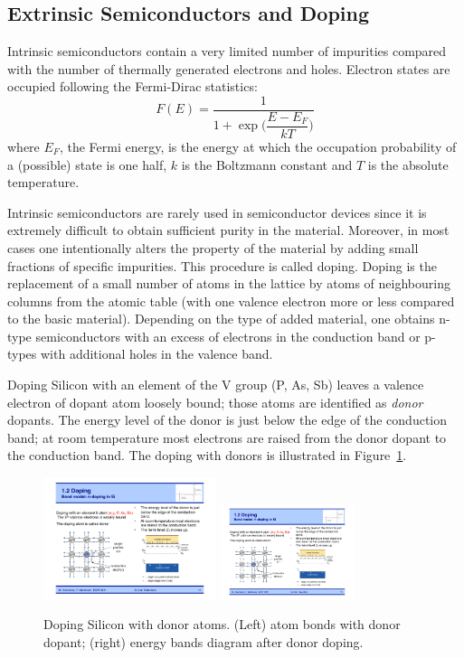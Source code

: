 \subsection{Extrinsic Semiconductors and Doping}

Intrinsic semiconductors contain a very limited number of impurities  compared with the number of 
thermally generated electrons and holes. 
Electron states are occupied following the Fermi-Dirac statistics:
\begin{equation}
F(E)=\dfrac{1}{1+\exp{\Bigg(\dfrac{E-E_F}{kT}}\Bigg)}
\label{eq:FermiDirac}	
\end{equation}
where $E_F$, the Fermi energy, is the energy at which the occupation probability of a (possible) 
state is one half, $k$ is the Boltzmann constant and $T$ is the absolute temperature.

Intrinsic semiconductors are rarely used in semiconductor 
devices since it is extremely difficult to obtain sufficient purity in the material. Moreover, in most cases 
one intentionally alters the property of the material by adding small fractions of specific impurities. 
This procedure is called doping.  Doping is the replacement of a small number of atoms in the lattice by 
atoms of neighbouring columns from the atomic table (with one valence electron more or less compared 
to the basic material). Depending on the type of added material, one obtains n-type 
semiconductors with an excess of electrons in the conduction band or p-types with additional holes in 
the valence band. 

Doping Silicon with an element of the V group (P, As, Sb) leaves a valence electron of dopant atom 
loosely bound; those atoms are identified  
as {\it donor} dopants. The energy level of the donor is just below the edge of the conduction band; 
at room temperature most electrons are raised from the donor dopant to the conduction band.  
The doping with donors  is illustrated in Figure~\ref{fig:nDoping}. 

 \begin{figure}[htbp]
   \centering
   \includegraphics[width=0.45\textwidth]{nDopingBonds.pdf} 
   \includegraphics[width=0.35\textwidth]{nDopingBands.pdf} 
   \caption{\label{fig:nDoping}Doping Silicon with donor atoms. (Left) atom bonds with donor dopant; 
   (right) energy bands diagram after donor doping.}
\end{figure}

